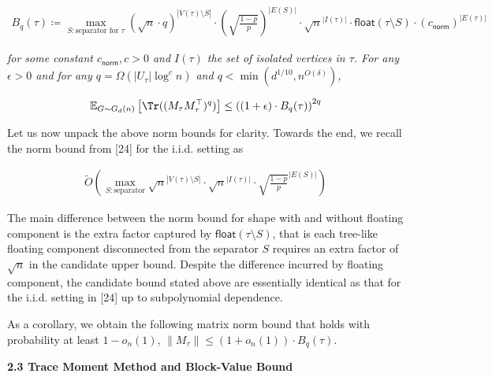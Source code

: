 \documentclass[10pt,a4paper]{article}
\begin{document}
\[\begin{gathered}
\displaystyle B_{q}(\tau)\coloneqq\max_{S:\text{separator for }\tau}(\sqrt{n}\cdot q)^{|V(\tau)\setminus S|}\cdot\left(\sqrt{\frac{1-p}{p}}\right)^{|E(S)|}\cdot\sqrt{n}^{|I(\tau)|}\cdot\mathsf{float}(\tau\setminus S)\cdot(c_{\mathsf{norm}})^{|E(\tau)|}
\end{gathered}\]


\emph{for some constant $c_{\mathsf{norm}},c>0$ and $I(\tau)$ the set of isolated vertices in $\tau$.
For any $\epsilon>0$ and for any $q=\Omega(|U_{\tau}|\log^{c}n)$ and $q<\min(d^{1/10},n^{O(\delta)})$,}\par


\[\begin{gathered}
\mathbb{E}_{G\sim G_{d}(n)}\left[\Tr((M_{\tau}M_{\tau}^{\top})^{q})\right]\leq\left((1+\epsilon)\cdot B_{q}(\tau)\right)^{2q}
\end{gathered}\]







Let us now unpack the above norm bounds for clarity. Towards the end, we recall the norm bound from [24] for the i.i.d. setting as\par


\[\begin{gathered}
\tilde{O}(\max_{S:\text{separator}}\sqrt{n}^{|V(\tau)\setminus S|}\cdot\sqrt{n}^{|I(\tau)|}\cdot\sqrt{\frac{1-p}{p}}^{|E(S)|})
\end{gathered}\]


The main difference between the norm bound for shape with and without floating component is the extra factor captured by $\mathsf{float}(\tau\setminus S)$, that is each tree-like floating component disconnected from the separator $S$ requires an extra factor of $\sqrt{n}$ in the candidate upper bound. Despite the difference incurred by floating component, the candidate bound stated above are essentially identical as that for the i.i.d. setting in [24] up to subpolynomial dependence.\par




As a corollary, we obtain the following matrix norm bound that holds with probability at least $1-o_{n}(1)$, $\|M_{\tau}\|\leq(1+o_{n}(1))\cdot B_{q}(\tau)$.\par





\par\medskip\noindent\textbf{
2.3 Trace Moment Method and Block-Value Bound}\par
\end{document}
